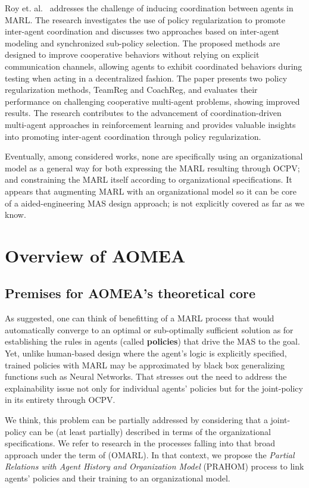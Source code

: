 \documentclass[runningheads]{llncs}
\begin{document}
Roy et. al.~\cite{Roy2020} addresses the challenge of inducing coordination between agents in MARL. The research investigates the use of policy regularization to promote inter-agent coordination and discusses two approaches based on inter-agent modeling and synchronized sub-policy selection. The proposed methods are designed to improve cooperative behaviors without relying on explicit communication channels, allowing agents to exhibit coordinated behaviors during testing when acting in a decentralized fashion. The paper presents two policy regularization methods, TeamReg and CoachReg, and evaluates their performance on challenging cooperative multi-agent problems, showing improved results. The research contributes to the advancement of coordination-driven multi-agent approaches in reinforcement learning and provides valuable insights into promoting inter-agent coordination through policy regularization.

Eventually, among considered works, none are specifically using an organizational model as a general way for both expressing the MARL resulting through OCPV; and constraining the MARL itself according to organizational specifications. It appears that augmenting MARL with an organizational model so it can be core of a aided-engineering MAS design approach; is not explicitly covered as far as we know.

\section{Overview of AOMEA}

\subsection{Premises for AOMEA's theoretical core}

As suggested, one can think of benefitting of a MARL process that would automatically converge to an optimal or sub-optimally sufficient solution as for establishing the rules in agents (called \textbf{policies}) that drive the MAS to the goal. Yet, unlike human-based design where the agent's logic is explicitly specified, trained policies with MARL may be approximated by black box generalizing functions such as Neural Networks. That stresses out the need to address the explainability issue not only for individual agents' policies but for the joint-policy in its entirety through OCPV.

We think, this problem can be partially addressed by considering that a joint-policy can be (at least partially) described in terms of the organizational specifications.
We refer to research in the processes falling into that broad approach under the term of  (OMARL).
In that context, we propose the \emph{Partial Relations with Agent History and Organization Model} (PRAHOM) process to link agents' policies and their training to an organizational model.
\end{document}
